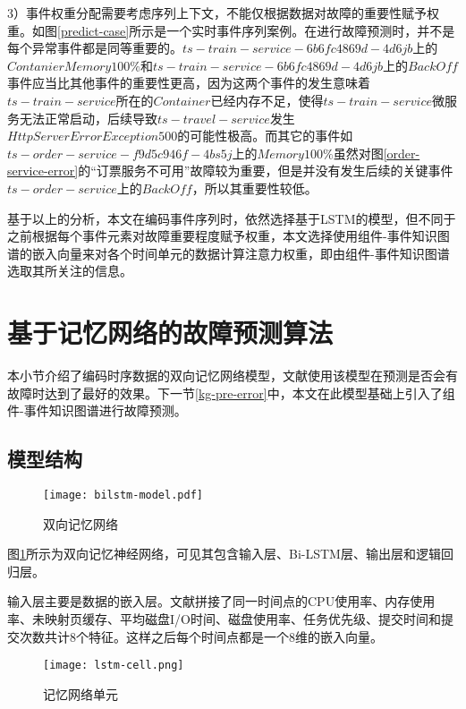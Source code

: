 3）事件权重分配需要考虑序列上下文，不能仅根据数据对故障的重要性赋予权重。如图\ref{predict-case}所示是一个实时事件序列案例。在进行故障预测时，并不是每个异常事件都是同等重要的。$ts-train-service-6b6fc4869d-4d6jb$上的$Contanier Memory 100\%$和$ts-train-service-6b6fc4869d-4d6jb$上的$BackOff$事件应当比其他事件的重要性更高，因为这两个事件的发生意味着$ts-train-service$所在的$Container$已经内存不足，使得$ts-train-service$微服务无法正常启动，后续导致$ts-travel-service$发生$HttpServerErrorException 500$的可能性极高。而其它的事件如$ts-order-service-f9d5c946f-4bs5j$上的$Memory 100\%$虽然对图\ref{order-service-error}的“订票服务不可用”故障较为重要，但是并没有发生后续的关键事件$ts-order-service$上的$BackOff$，所以其重要性较低。

基于以上的分析，本文在编码事件序列时，依然选择基于LSTM的模型，但不同于之前根据每个事件元素对故障重要程度赋予权重\cite{gao2020task}，本文选择使用组件-事件知识图谱的嵌入向量来对各个时间单元的数据计算注意力权重，即由组件-事件知识图谱选取其所关注的信息。

\section{基于记忆网络的故障预测算法}\label{memory-net-section}
本小节介绍了编码时序数据的双向记忆网络模型，文献\parencite{gao2020task}使用该模型在预测是否会有故障时达到了最好的效果。下一节\ref{kg-pre-error}中，本文在此模型基础上引入了组件-事件知识图谱进行故障预测。
\subsection{模型结构}
\begin{figure}[htbp]
    \centering
    \texttt{[image: bilstm-model.pdf]}
    \caption{双向记忆网络\label{bilstm-model}}
\end{figure}
图\ref{bilstm-model}所示为双向记忆神经网络，可见其包含输入层、Bi-LSTM层、输出层和逻辑回归层。

输入层主要是数据的嵌入层。文献\parencite{gao2020task}拼接了同一时间点的CPU使用率、内存使用率、未映射页缓存、平均磁盘I/O时间、磁盘使用率、任务优先级、提交时间和提交次数共计8个特征。这样之后每个时间点都是一个8维的嵌入向量。
\begin{figure}[htbp]
    \centering
    \texttt{[image: lstm-cell.png]}
    \caption{记忆网络单元\label{lstm-cell}}
\end{figure}

